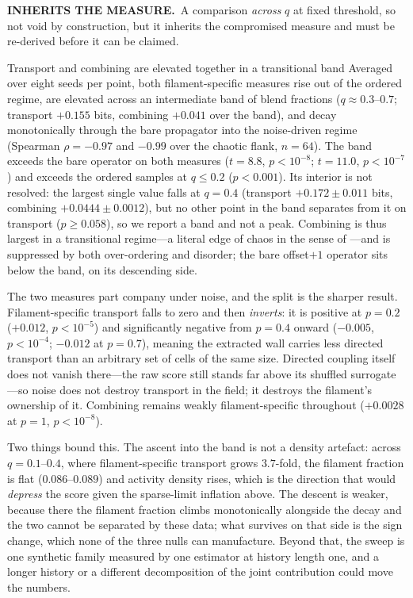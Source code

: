 \documentclass[man,12pt,floatsintext,donotrepeattitle]{apa7}
\newcommand{\flagged}[3]{%
  \par\vspace{3pt}\noindent
  \colorbox{#1}{\parbox{\dimexpr\linewidth-2\fboxsep\relax}{%
    \footnotesize\textbf{#2}\ #3}}%
  \par\vspace{3pt}}
\begin{document}
\flagged{markInherit}{INHERITS THE MEASURE.}{A comparison \emph{across} $q$ at
fixed threshold, so not void by construction, but it inherits the compromised
measure and must be re-derived before it can be claimed.}
\begin{observation}[label={obs:eoc-compute}]{Transport and combining are elevated together in a transitional band}
Averaged over eight seeds per point, both filament-specific measures rise out of
the ordered regime, are elevated across an intermediate band of blend fractions
($q \approx 0.3$--$0.7$; transport $+0.155$ bits, combining $+0.041$ over the
band), and decay monotonically through the bare propagator into the noise-driven
regime (Spearman $\rho = -0.97$ and $-0.99$ over the chaotic flank, $n = 64$).
The band exceeds the bare operator on both measures ($t = 8.8$, $p < 10^{-8}$;
$t = 11.0$, $p < 10^{-7}$) and exceeds the ordered samples at $q \le 0.2$
($p < 0.001$). Its interior is not resolved: the largest single value falls at
$q = 0.4$ (transport $+0.172 \pm 0.011$ bits, combining
$+0.0444 \pm 0.0012$), but no other point in the band separates from it on
transport ($p \ge 0.058$), so we report a band and not a peak. Combining is thus
largest in a transitional regime---a literal edge of chaos in the sense of
\textcite{langton1990computation}---and is suppressed by both over-ordering and
disorder; the bare offset$+1$ operator sits below the band, on its descending
side.

The two measures part company under noise, and the split is the sharper result.
Filament-specific transport falls to zero and then \emph{inverts}: it is
positive at $p = 0.2$ ($+0.012$, $p < 10^{-5}$) and significantly negative from
$p = 0.4$ onward ($-0.005$, $p < 10^{-4}$; $-0.012$ at $p = 0.7$), meaning the
extracted wall carries less directed transport than an arbitrary set of cells of
the same size. Directed coupling itself does not vanish there---the raw score
still stands far above its shuffled surrogate---so noise does not destroy
transport in the field; it destroys the filament's ownership of it. Combining
remains weakly filament-specific throughout ($+0.0028$ at $p = 1$,
$p < 10^{-8}$).
\end{observation}

Two things bound this. The ascent into the band is not a density artefact:
across $q = 0.1$--$0.4$, where filament-specific transport grows $3.7$-fold, the
filament fraction is flat ($0.086$--$0.089$) and activity density rises, which is
the direction that would \emph{depress} the score given the sparse-limit
inflation above. The descent is weaker, because there the filament fraction
climbs monotonically alongside the decay and the two cannot be separated by
these data; what survives on that side is the sign change, which none of the
three nulls can manufacture. Beyond that, the sweep is one synthetic family
measured by one estimator at history length one, and a longer history or a
different decomposition of the joint contribution could move the numbers.
\end{document}
